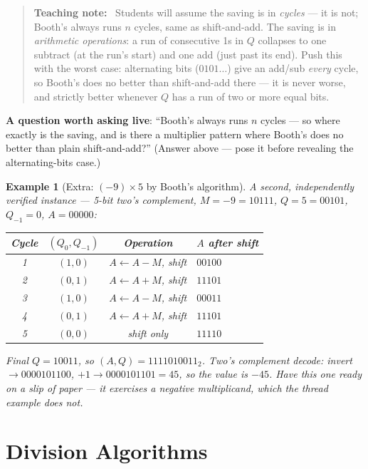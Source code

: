 \documentclass[11pt]{article}
\newtheorem{example}{Example}[section]
\newenvironment{teachingaside}{\begin{quote}\small\color{primary-gold}\textbf{Teaching note:}\ }{\end{quote}}
\begin{document}
\begin{teachingaside}
Students will assume the saving is in \emph{cycles} --- it is not; Booth's always runs $n$ cycles, same as shift-and-add. The saving is in \emph{arithmetic operations}: a run of consecutive 1s in $Q$ collapses to one subtract (at the run's start) and one add (just past its end). Push this with the worst case: alternating bits ($0101\dots$) give an add/sub \emph{every} cycle, so Booth's does no better than shift-and-add there --- it is never worse, and strictly better whenever $Q$ has a run of two or more equal bits.
\end{teachingaside}

\textbf{A question worth asking live}: ``Booth's always runs $n$ cycles --- so where exactly is the saving, and is there a multiplier pattern where Booth's does no better than plain shift-and-add?'' (Answer above --- pose it before revealing the alternating-bits case.)

\begin{example}[Extra: $(-9) \times 5$ by Booth's algorithm]
A second, independently verified instance --- 5-bit two's complement, $M=-9=10111$, $Q=5=00101$, $Q_{-1}=0$, $A=00000$:
\begin{center}
\small
\begin{tabular}{@{}cccl@{}}
\toprule
Cycle & $(Q_0,Q_{-1})$ & Operation & $A$ after shift \\
\midrule
1 & $(1,0)$ & $A\gets A-M$, shift & $00100$ \\
2 & $(0,1)$ & $A\gets A+M$, shift & $11101$ \\
3 & $(1,0)$ & $A\gets A-M$, shift & $00011$ \\
4 & $(0,1)$ & $A\gets A+M$, shift & $11101$ \\
5 & $(0,0)$ & shift only & $11110$ \\
\bottomrule
\end{tabular}
\end{center}
Final $Q=10011$, so $(A,Q)=1111010011_2$. Two's complement decode: invert $\to 0000101100$, $+1 \to 0000101101 = 45$, so the value is $-45$.  Have this one ready on a slip of paper --- it exercises a negative multiplicand, which the thread example does not.
\end{example}

\section{Division Algorithms}
\end{document}
